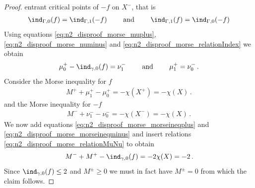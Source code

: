 \begin{proof}
  entrant critical points of $-f$ on $X^-$, that is
  \begin{align}
    \ind_{\Gamma,0}(f)=\ind_{\Gamma,1}(-f)\qquad\text{ and }\qquad 
    \ind_{\Gamma,1}(f)=\ind_{\Gamma,0}(-f)\label{eq:n2_disproof_morse_relationIndex} 
  \end{align}
  Using equations \eqref{eq:n2_disproof_morse_muplus}, \eqref{eq:n2_disproof_morse_numinus} and \eqref{eq:n2_disproof_morse_relationIndex}
  we obtain
  \begin{align}
    \mu^+_0-\ind_{\gamma,0}(f)=\nu^-_1 \qquad\text{ and }\qquad \mu^+_1=\nu^-_0\,.\label{eq:n2_disproof_morse_relationMuNu}
  \end{align}
  Consider the Morse inequality for $f$
  \begin{align}
    M^++\mu^+_1-\mu^+_0=-\chi(X^+)=-\chi(X)\,.\label{eq:n2_disproof_morse_morseineqplus}
  \end{align}
  and the Morse inequality for $-f$
  \begin{align}
    M^-+\nu^-_1-\nu^-_0=-\chi(X^-)=-\chi(X)\,.\label{eq:n2_disproof_morse_morseineqminus}
  \end{align}
  We now add equations \eqref{eq:n2_disproof_morse_morseineqplus} and \eqref{eq:n2_disproof_morse_morseineqminus}
  and insert relations \eqref{eq:n2_disproof_morse_relationMuNu} to obtain
  \begin{align*}
    M^-+M^+-\ind_{\gamma,0}(f)=-2\chi(X)=-2\,.
  \end{align*}
  Since $\ind_{\gamma,0}(f)\leq2$ and $M^\pm\geq0$ we must in fact have $M^\pm=0$ from which the claim follows.


  

\end{proof}
